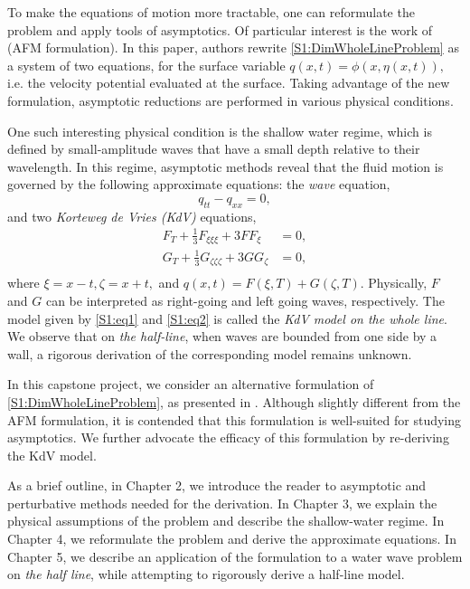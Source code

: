 To make the equations of motion more tractable, one can reformulate the problem and apply tools of asymptotics. Of particular interest is the work of \cite{AFM2006} (AFM formulation). In this paper, authors rewrite \eqref{S1:DimWholeLineProblem} as a system of two equations, for the surface variable $q(x,t) = \phi(x, \eta(x,t)),$ i.e. the velocity potential evaluated at the surface. Taking advantage of the new formulation, asymptotic reductions are performed in various physical conditions.

One such interesting physical condition is the shallow water regime, which is defined by small-amplitude waves that have a small depth relative to their wavelength. In this regime, asymptotic methods reveal that the fluid motion is governed by the following approximate equations: the \textit{wave} equation,
\begin{equation}\label{S1:eq1}
q_{tt} - q_{xx} = 0,
\end{equation} 
and two \textit{Korteweg de Vries (KdV)} equations,
\begin{equation}\label{S1:eq2}
\begin{aligned}
F_{T} + \frac{1}{3}F_{\xi \xi \xi} + 3 F F_{\xi} &= 0, \\
G_{T} + \frac{1}{3}G_{\zeta \zeta \zeta} + 3 G G_{\zeta} &= 0, \\
\end{aligned}
\end{equation}
where $\xi = x -t, \zeta = x+ t,$ and $q(x,t) = F(\xi, T) + G(\zeta, T).$ Physically, $F$ and $G$ can be interpreted as right-going and left going waves, respectively. The model given by \eqref{S1:eq1} and \eqref{S1:eq2} is called the \textit{KdV model on the whole line}. We observe that on \textit{the half-line}, when waves are bounded from one side by a wall, a rigorous derivation of the corresponding model remains unknown.

In this capstone project, we consider an alternative formulation of \eqref{S1:DimWholeLineProblem}, as presented in \cite{OV2013}. Although slightly different from the AFM formulation, it is contended that this formulation is well-suited for studying asymptotics. We further advocate the efficacy of this formulation by re-deriving the KdV model. 

As a brief outline, in Chapter 2, we introduce the reader to asymptotic and perturbative methods needed for the derivation. In Chapter 3, we explain the physical assumptions of the problem and describe the shallow-water regime. In Chapter 4, we reformulate the problem and derive the approximate equations.  In Chapter 5, we describe an application of the formulation to a water wave problem on \textit{the half line}, while attempting to rigorously derive a half-line model. 
